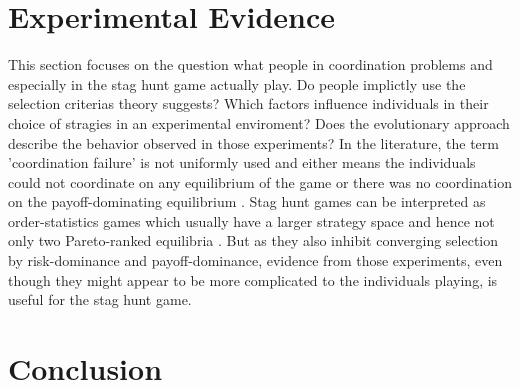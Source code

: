 \documentclass[12pt]{article}
\begin{document}
\section{Experimental Evidence}
This section focuses on the question what people in coordination problems
and especially in the stag hunt game actually play. Do people implictly
use the selection criterias theory suggests? Which factors influence
individuals in their choice of stragies in an experimental enviroment? Does 
the evolutionary approach describe the behavior observed in those experiments?
In the literature, the term 'coordination failure' is not uniformly used and
either means the individuals could not coordinate on any equilibrium of the game
or there was no coordination on the payoff-dominating equilibrium 
\cite{whenandwhy}.
Stag hunt games can be interpreted as order-statistics games which usually 
have a larger strategy space and hence not only two Pareto-ranked equilibria
\cite{WhenandWhy}.
But as they also inhibit converging selection by risk-dominance and 
payoff-dominance, evidence from those experiments, even though they might 
appear to be more complicated to the individuals playing, is useful
for the stag hunt game. 







































\section{Conclusion}
\printbibliography
\end{document}
